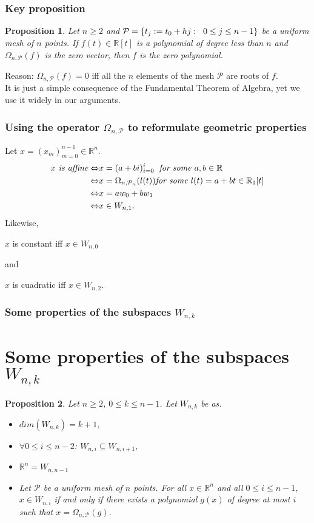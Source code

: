 \documentclass[]{beamer}
\newtheorem{prop}{\bf Proposition}
\theoremstyle{definition}
\newcommand{\IR}{\mathbb{R}}
\newcommand{\cali}[1]{\mathcal{#1}} %
\begin{document}
\begin{frame}
\frametitle{Key proposition}
\begin{prop}
Let $n \geq 2$ and $\cali{P} = \{ t_{j} := t_{0}+ hj : 
	\hspace{0.2cm} 0 \leq j \leq n-1 \}$ be a uniform mesh 
	of $n$ points. If $f(t) \in \IR[t]$ is a polynomial
	of degree less than $n$ and $\Omega_{n, \cali{P}}(f)$
	is the zero vector, then $f$ is the zero polynomial.
\end{prop}

Reason: $\Omega_{n, \cali{P}}(f) = 0$ iff
all the $n$ elements of the mesh $\cali{P}$ are roots of $f$. \\

It is just a simple consequence of the Fundamental
Theorem of Algebra, yet we use it widely in our arguments.
\end{frame}


\begin{frame}
\frametitle{Using the operator $\Omega_{n, \cali{P}}$ to reformulate geometric properties}
Let $x = (x_{m})_{m=0}^{n-1} \in \IR^{n}$.
\begin{align*}
x \textit{ is affine}  \Leftrightarrow &
x = (a + bi)_{i=0}^{i} \hspace{0.2cm} \textit{for some } a, b \in \IR \\
\Leftrightarrow & x = \Omega_{n, \cali{P}_{n}}(l(t)) \textit{for some } l(t) = a+bt \in \IR_{1}[t] \\
\Leftrightarrow & x = a w_{0} + bw_{1} \\
\Leftrightarrow & x \in W_{n, 1}.
\end{align*}
Likewise, 
\begin{center}
$x$ is constant iff $x \in W_{n,0}$
\end{center}
and
\begin{center}
$x$ is cuadratic iff $x \in W_{n,2}$.
\end{center}
\end{frame}

\begin{frame}
\frametitle{Some properties of the subspaces $W_{n,k}$}
\section{Some properties of the subspaces $W_{n,k}$}
\begin{prop}
		Let $n \geq 2$, $0 \leq k \leq n-1$. Let $W_{n,k}$
		be as.
		\begin{itemize}
		\item $dim(W_{n,k}) = k+1$, 
		\item $\forall 0 \leq i \leq n-2$: $W_{n, i} \subseteq W_{n, i+1}$,
		\item $\IR^{n} = W_{n, n-1}$
		\item Let $\cali{P}$ be a uniform mesh of $n$
		points. For all $x \in \IR^{n}$ and all $0 \leq i \leq n-1$, $x \in W_{n,i}$
		if and only if there exists a polynomial $g(x)$ of degree at most
		$i$ such that $x = \Omega_{n, \cali{P}}(g)$.
		\end{itemize}
\end{prop}
\end{frame}
\end{document}

